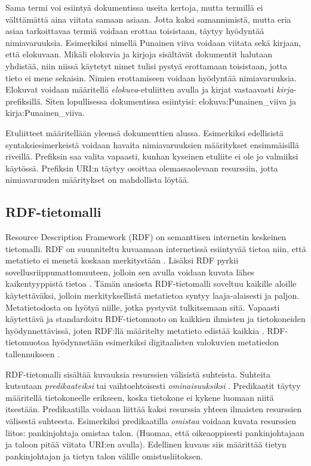 \documentclass[finnish, 12pt, a4paper, elec, utf8, pdfa, online]{aaltothesis}
\begin{document}
 Sama termi voi esiintyä dokumentissa useita kertoja, mutta termillä ei välttämättä aina viitata samaan asiaan. Jotta kaksi samannimistä, mutta eria asiaa tarkoittavaa termiä voidaan erottaa toisistaan, täytyy hyödyntää nimiavaruuksia. Esimerkiksi nimellä Punainen viiva voidaan viitata sekä kirjaan, että elokuvaan. Mikäli elokuvia ja kirjoja sisältävät dokumentit halutaan yhdistää, niin niissä käytetyt nimet tulisi pystyä erottamaan toisistaan, jotta tieto ei mene sekaisin. Nimien erottamiseen voidaan hyödyntää nimiavaruuksia. Elokuvat voidaan määritellä \textit{elokuva}-etuliitten avulla ja kirjat vastaavasti \textit{kirja}-prefiksillä. Siten lopullisessa dokumentissa esiintyisi: elokuva:Punainen\_viiva ja kirja:Punainen\_viiva.

 Etuliitteet määritellään yleensä dokumenttien alussa. Esimerkiksi edellisistä syntaksiesimerkeistä voidaan havaita nimiavaruuksien määritykset ensimmäisillä riveillä. Prefiksin saa valita vapaasti, kunhan kyseinen etuliite ei ole jo valmiiksi käytössä. Prefiksin URI:n täytyy osoittaa olemassaolevaan resurssiin, jotta nimiavaruuden määritykset on mahdollista löytää.

\subsection{RDF-tietomalli}
Resource Description Framework (RDF) on semanttisen internetin keskeinen tietomalli. RDF on suunniteltu kuvaamaan internetissä esiintyvää tietoa niin, että metatieto ei menetä koskaan merkitystään \cite{RDF_specification}. Lisäksi RDF pyrkii sovellusriippumattomuuteen, jolloin sen avulla voidaan kuvata lähes kaikentyyppistä tietoa \cite{RDF_specification}. Tämän ansiosta RDF-tietomalli soveltuu kaikille aloille käytettäväksi, jolloin merkityksellistä metatietoa syntyy laaja-alaisesti ja paljon. Metatietodosta on hyötyä niille, jotka pystyvät tulkitsemaan sitä. Vapaasti käytettävä ja standardoitu RDF-tietomuoto on kaikkien ihmisten ja tietokoneiden hyödynnettävissä, joten RDF:llä määritelty metatieto edistää kaikkia \cite{metadata}. RDF-tietomuotoa hyödynnetään esimerkiksi digitaalisten valokuvien metatiedon tallennukseen \cite{XMP1} \cite{profium_metadata}.

RDF-tietomalli sisältää kuvauksia resurssien välisistä suhteista. Suhteita kutsutaan \textit{predikaateiksi} tai vaihtoehtoisesti \textit{ominaisuuksiksi} \cite{Antoniou}. Predikaatit täytyy määritellä tietokoneelle erikseen, koska tietokone ei kykene luomaan niitä itsestään. Predikaatilla voidaan liittää kaksi resurssia yhteen ilmaisten resurssien välisestä suhteesta. Esimerkiksi predikaatilla \textit{omistaa} voidaan kuvata resurssien liitos: pankinjohtaja omistaa talon. (Huomaa, että oikeaoppisesti pankinjohtajaan ja taloon pitää viitata URI:en avulla). Edellinen kuvaus siis määrittää tietyn pankinjohtajan ja tietyn talon välille omistusliitoksen.
\end{document}

